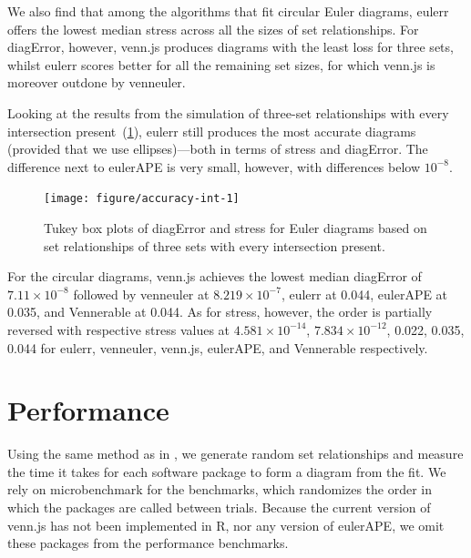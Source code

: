 \documentclass[
  oneside,
  openany,
  numbers=noendperiod,
  parskip=half,
  bibliography=totoc
]{scrbook}\usepackage[]{graphicx}\usepackage{xcolor}
\newenvironment{knitrout}{}{} %
\newcommand{\pkg}[1]{{\fontseries{b}\selectfont #1}}
\begin{document}
We also find that among the algorithms that fit circular Euler diagrams,
\pkg{eulerr} offers the lowest median stress across all the sizes of set
relationships. For diagError, however, \pkg{venn.js} produces diagrams with the
least loss for three sets, whilst \pkg{eulerr} scores better for all the remaining set sizes,
for which \pkg{venn.js} is moreover outdone by \pkg{venneuler}.



Looking at the results from the simulation of three-set relationships with
every intersection present~(\cref{fig:accuracy-int}), \pkg{eulerr} still
produces the most accurate diagrams (provided that we use ellipses)---both in
terms of stress and diagError. The
difference next to \pkg{eulerAPE} is very small, however, with differences
below $10^{-8}$.

\begin{figure}[hbtp]
\caption{Tukey box plots of diagError and stress for Euler diagrams
based on set relationships of three sets with every
intersection present.\label{fig:accuracy-int}}
\begin{knitrout}\small
{}\color{fgcolor}

{\centering \texttt{[image: figure/accuracy-int-1]}

}



\end{knitrout}
\end{figure}

For the circular diagrams, \pkg{venn.js} achieves the lowest median diagError of
\ensuremath{7.11\times 10^{-8}} followed by \pkg{venneuler} at \ensuremath{8.219\times 10^{-7}},
\pkg{eulerr} at 0.044, \pkg{eulerAPE} at 0.035,
and \pkg{Vennerable} at 0.044. As for stress, however, the order is
partially reversed with respective stress values at
\ensuremath{4.581\times 10^{-14}}, \ensuremath{7.834\times 10^{-12}}, 0.022, 0.035,
0.044 for
\pkg{eulerr}, \pkg{venneuler}, \pkg{venn.js}, \pkg{eulerAPE}, and \pkg{Vennerable}
respectively.

\section{Performance}
\label{sec:performance}

Using the same method as in , we generate random set
relationships and measure the time it takes for each software package to form a
diagram from the fit. We rely on \pkg{microbenchmark} for the benchmarks,
which randomizes the order in which the packages are called between trials.
Because the current version of \pkg{venn.js} has not been implemented in R, nor
any version of \pkg{eulerAPE}, we omit these packages from the
performance benchmarks.
\end{document}
